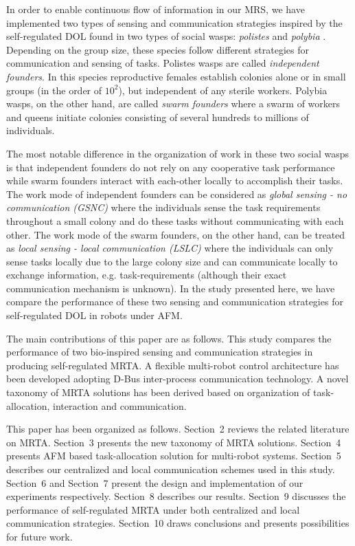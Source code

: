 \documentclass[journal]{IEEEtran}
\begin{document}
In order to enable continuous flow of information in our \acl{MRS}, we have implemented two types of sensing and communication strategies inspired by the self-regulated DOL found in two types of social wasps: {\em polistes} and {\em polybia} \cite{Jeanne1999}. Depending on the group size, these species follow different strategies for communication and sensing of tasks. Polistes wasps are called {\em independent founders}.  In this species reproductive females establish colonies alone or in small groups (in the order of $10^2$), but independent of any sterile workers.  Polybia wasps, on the other hand, are called {\em swarm founders} where a swarm of workers and queens initiate colonies consisting of several hundreds to millions of individuals.  

The most notable difference in the organization of work in these two social wasps is that independent founders do not rely on any cooperative task performance while swarm founders interact with each-other locally to accomplish their tasks.  The work mode of independent founders can be considered as {\em global sensing - no communication (GSNC)} where the individuals sense the task requirements throughout a small colony and do these tasks without communicating with each other.  The work mode of the swarm founders, on the other hand, can be treated as {\em local sensing - local communication (LSLC)} where the individuals can only sense tasks locally due to the large colony size and can communicate locally to exchange information, e.g. task-requirements (although their exact communication mechanism is unknown).  In the study presented here, we have compare the performance of these two sensing and communication strategies for self-regulated DOL in robots under AFM. 

The main contributions of this paper are as follows.
This study compares the performance of two bio-inspired sensing and communication strategies in producing self-regulated MRTA.
A flexible multi-robot control architecture has been developed adopting D-Bus inter-process communication technology. A novel taxonomy of MRTA solutions has been derived based on organization of task-allocation, interaction and communication.

This paper has been organized as follows.
Section~2 reviews the related literature on MRTA.
Section~3 presents the new taxonomy of MRTA solutions.
Section~4 presents AFM based task-allocation solution for multi-robot systems. 
Section~5  describes our centralized and local communication schemes used in this study.
Section~6 and Section~7 present the design and implementation of our experiments respectively.
Section~8 describes our results. 
Section~9 discusses the performance of self-regulated MRTA under both centralized and local communication strategies.
Section~10 draws conclusions and presents possibilities for future work.
\end{document}
